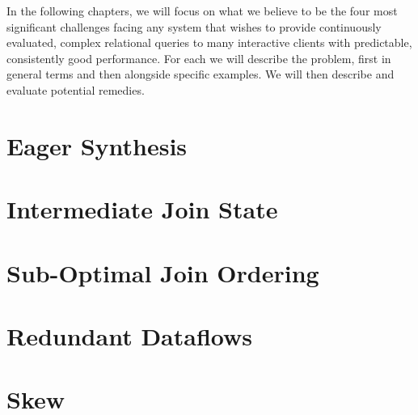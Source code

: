 \documentclass[../index.tex]{subfiles}
\begin{document}
In the following chapters, we will focus on what we believe to be the
four most significant challenges facing any system that wishes to
provide continuously evaluated, complex relational queries to many
interactive clients with predictable, consistently good
performance. For each we will describe the problem, first in general
terms and then alongside specific examples. We will then describe and
evaluate potential remedies.

\section{Eager Synthesis} \label{case-eagerness}

\newpage

\section{Intermediate Join State} \label{case-join-state}

\newpage

\section{Sub-Optimal Join Ordering} \label{case-join-ordering}

\newpage

\section{Redundant Dataflows} \label{case-redundant-dataflows}

\newpage

\section{Skew} \label{case-skew} \label{case-skew}

\newpage
\end{document}
